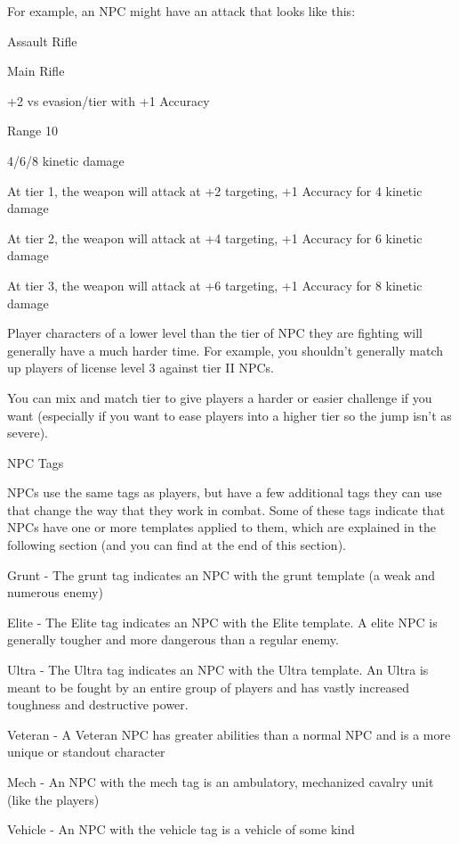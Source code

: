 For example, an NPC might have an attack that looks like this:


Assault Rifle

Main Rifle

+2 vs evasion/tier with +1 Accuracy

Range 10

4/6/8 kinetic damage


At tier 1, the weapon will attack at +2 targeting, +1 Accuracy for 4 kinetic damage

At tier 2, the weapon will attack at +4 targeting, +1 Accuracy for 6 kinetic damage

At tier 3, the weapon will attack at +6 targeting, +1 Accuracy for 8 kinetic damage


Player characters of a lower level than the tier of NPC they are fighting will generally have a much
harder time. For example, you shouldn’t generally match up players of license level 3 against tier
II NPCs.





You can mix and match tier to give players a harder or easier challenge if you want (especially if
you want to ease players into a higher tier so the jump isn’t as severe).


                                                 NPC Tags

NPCs use the same tags as players, but have a few additional tags they can use that change the
way that they work in combat. Some of these tags indicate that NPCs have one or more
templates applied to them, which are explained in the following section (and you can find at the
end of this section).


Grunt - The grunt tag indicates an NPC with the grunt template (a weak and numerous enemy)

Elite - The Elite tag indicates an NPC with the Elite template. A elite NPC is generally tougher
and more dangerous than a regular enemy.

Ultra - The Ultra tag indicates an NPC with the Ultra template. An Ultra is meant to be fought by
an entire group of players and has vastly increased toughness and destructive power.

Veteran - A Veteran NPC has greater abilities than a normal NPC and is a more unique or
standout character


Mech - An NPC with the mech tag is an ambulatory, mechanized cavalry unit (like the players)

Vehicle - An NPC with the vehicle tag is a vehicle of some kind

